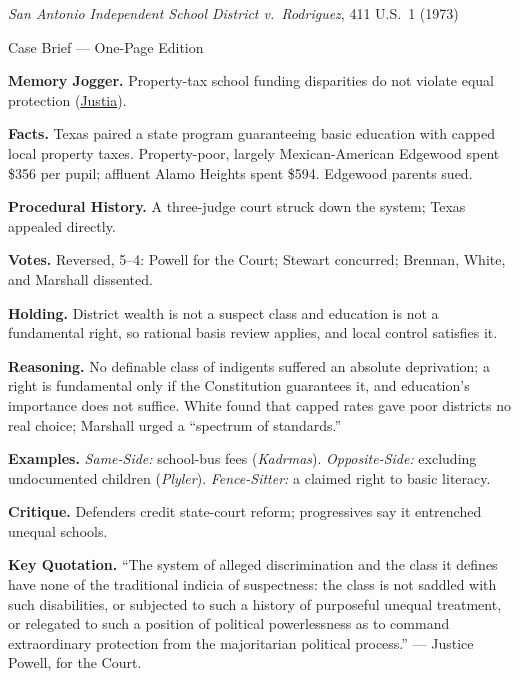 \documentclass[12pt]{article}
\begin{document}
\begin{center}
{\Large \textit{San Antonio Independent School District v.\ Rodriguez}, 411 U.S.\ 1 (1973)\par}
\vspace{0.3em}
{\normalsize Case Brief --- One-Page Edition\par}
\end{center}

\textbf{Memory Jogger.} Property-tax school funding disparities do not violate equal protection (\href{https://supreme.justia.com/cases/federal/us/411/1/}{Justia}).

\textbf{Facts.} Texas paired a state program guaranteeing basic education with capped local property taxes. Property-poor, largely Mexican-American Edgewood spent \$356 per pupil; affluent Alamo Heights spent \$594. Edgewood parents sued.

\textbf{Procedural History.} A three-judge court struck down the system; Texas appealed directly.

\textbf{Votes.} Reversed, 5--4: Powell for the Court; Stewart concurred; Brennan, White, and Marshall dissented.

\textbf{Holding.} District wealth is not a suspect class and education is not a fundamental right, so rational basis review applies, and local control satisfies it.

\textbf{Reasoning.} No definable class of indigents suffered an absolute deprivation; a right is fundamental only if the Constitution guarantees it, and education's importance does not suffice. White found that capped rates gave poor districts no real choice; Marshall urged a ``spectrum of standards.''

\textbf{Examples.} \emph{Same-Side:} school-bus fees (\textit{Kadrmas}). \emph{Opposite-Side:} excluding undocumented children (\textit{Plyler}). \emph{Fence-Sitter:} a claimed right to basic literacy.

\textbf{Critique.} Defenders credit state-court reform; progressives say it entrenched unequal schools.

\textbf{Key Quotation.} ``The system of alleged discrimination and the class it defines have none of the traditional indicia of suspectness: the class is not saddled with such disabilities, or subjected to such a history of purposeful unequal treatment, or relegated to such a position of political powerlessness as to command extraordinary protection from the majoritarian political process.'' --- Justice Powell, for the Court.
\end{document}
